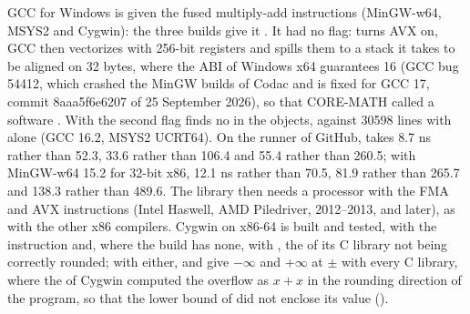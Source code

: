 \medskip
GCC for Windows is given the fused multiply-add instructions (MinGW-w64,
MSYS2 and Cygwin): the three builds give it .\newinvfive{} It had no flag: 
turns AVX on, GCC then vectorizes with 256-bit registers and spills them to a
stack it takes to be aligned on 32 bytes, where the ABI of Windows x64
guarantees 16 (GCC bug 54412, which crashed the MinGW builds of Codac and is
fixed for GCC 17, commit 8aaa5f6e6207 of 25 September 2026), so that CORE-MATH called a software . With the
second flag  finds no  in the objects, against
30598 lines with  alone (GCC 16.2, MSYS2 UCRT64). On the
runner of GitHub,  takes 8.7 ns rather than 52.3,
 33.6 rather than 106.4 and  55.4 rather than
260.5; with MinGW-w64 15.2 for 32-bit x86, 12.1 ns rather than 70.5, 81.9
rather than 265.7 and 138.3 rather than 489.6. The library then needs a
processor with the FMA and AVX instructions (Intel Haswell, AMD Piledriver,
2012--2013, and later), as with the other x86 compilers. Cygwin on x86-64 is
built and tested, with the instruction and, where the build has none, with
, the  of its C library not being correctly
rounded; with either, 
and  give $-\infty$ and $+\infty$ at $\pm$
with every C library, where the  of Cygwin computed the
overflow as $x + x$ in the rounding direction of the program, so that the
lower bound of  did not enclose its value
().

